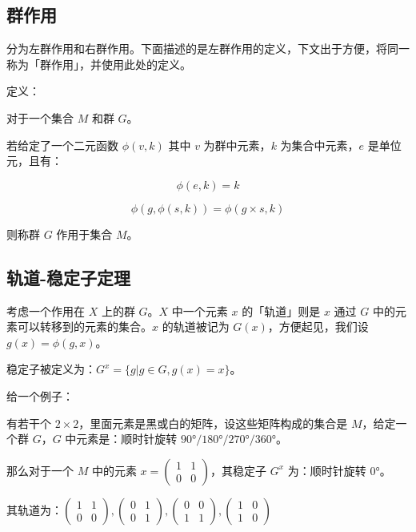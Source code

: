 \subsection{群作用}

分为左群作用和右群作用。下面描述的是左群作用的定义，下文出于方便，将同一称为「群作用」，并使用此处的定义。

定义：

对于一个集合 $M$ 和群 $G$。

若给定了一个二元函数 $\phi(v,k)$ 其中 $v$ 为群中元素，$k$ 为集合中元素，$e$ 是单位元，且有：

$$\phi(e,k)=k$$

$$\phi(g,\phi(s,k))=\phi(g \times s,k)$$

则称群 $G$ 作用于集合 $M$。

\subsection{轨道-稳定子定理}

考虑一个作用在 $X$ 上的群 $G$。$X$ 中一个元素 $x$ 的「轨道」则是 $x$ 通过 $G$ 中的元素可以转移到的元素的集合。$x$ 的轨道被记为 $G(x)$，方便起见，我们设 $g(x)=\phi(g,x)$。

稳定子被定义为：$G^x=\{g|g\in G,g(x)=x\}$。

给一个例子：

有若干个 $2 \times 2$，里面元素是黑或白的矩阵，设这些矩阵构成的集合是 $M$，给定一个群 $G$，$G$ 中元素是：顺时针旋转 $90°/180°/270°/360°$。

那么对于一个 $M$ 中的元素 $x=\left(\begin{array}{cc}
    1 & 1 \\
    0 & 0
    \end{array}\right)$，其稳定子 $G^x$ 为：顺时针旋转 $0°$。

其轨道为：$\left(\begin{array}{cc}
    1 & 1 \\
    0 & 0
    \end{array}\right),\left(\begin{array}{cc}
        0 & 1 \\
        0 & 1
        \end{array}\right),\left(\begin{array}{cc}
            0 & 0 \\
            1 & 1
            \end{array}\right),\left(\begin{array}{cc}
                1 & 0 \\
                1 & 0
                \end{array}\right)$

